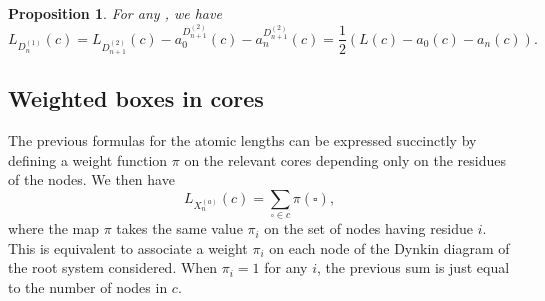 \documentclass[10pt,a4paper]{amsart}
\newtheorem{Proposition}[Theorem]{Proposition}
 { \theoremstyle{definition}
\newtheorem{Definition}[Theorem]{Definition}
\newtheorem{Note}[Theorem]{Note}
\newtheorem{Example}[Theorem]{Example}
\newtheorem{Remark}[Theorem]{Remark} }
\numberwithin{equation}{section}
\begin{document}
\begin{Proposition}
	\label{Prop_D(n,1)} For any , we have
	\begin{equation*}
	L_{D_{n}^{(1)}}(c)=L_{D_{n+1}^{(2)}}(c)-a_{0}^{D_{n+1}^{(2)}}(c)-a_{n}^{D_{n+1}^{(2)}}(c)=
	\frac{1}{2}(L(c)-a_{0}(c)-a_{n}(c)).
	\end{equation*}
\end{Proposition}

\subsection{Weighted boxes in cores}\label{subsec:weighted}

The previous formulas for the atomic lengths can be expressed succinctly by
defining a weight function $\pi $ on the relevant cores depending only on
the residues of the nodes. We then have
\begin{equation*}
L_{X_{n}^{(a)}}(c)=\sum_{\square \in c}\pi (\square ),
\end{equation*}%
where the map $\pi $ takes the same value $\pi _{i}$ on the set of nodes
having residue $i$. This is equivalent to associate a weight $\pi _{i}$ on
each node of the Dynkin diagram of the root system considered. When $\pi
_{i}=1$ for any $i$, the previous sum is just equal to the number of nodes
in $c$.
\end{document}
